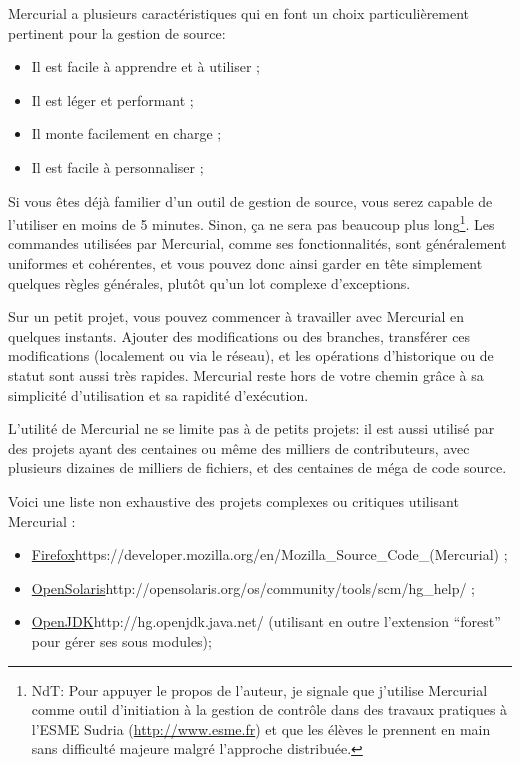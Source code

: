 Mercurial a plusieurs caractéristiques qui en font un choix particulièrement
pertinent pour la gestion de source:
\begin{itemize}
	\item Il est facile à apprendre et à utiliser ;
	\item Il est léger et performant ;
	\item Il monte facilement en charge ; 
	\item Il est facile à personnaliser ;
\end{itemize}

Si vous êtes déjà familier d'un outil de gestion de source, vous serez
capable de l'utiliser en moins de 5 minutes. Sinon, ça ne sera pas beaucoup
plus long\footnote{NdT: Pour appuyer le propos de l'auteur, je signale que 
j'utilise Mercurial comme outil d'initiation à la gestion de contrôle dans
des travaux pratiques à l'ESME Sudria (\url{http://www.esme.fr}) et que les
élèves le prennent en main sans difficulté majeure malgré l'approche distribuée.}. 
Les commandes utilisées par Mercurial, comme ses fonctionnalités, sont 
généralement uniformes et cohérentes, et vous pouvez donc ainsi garder en tête 
simplement quelques règles générales, plutôt qu'un lot complexe d'exceptions.

Sur un petit projet, vous pouvez commencer à travailler avec Mercurial en
quelques instants. Ajouter des modifications ou des branches, transférer 
ces modifications (localement ou via le réseau), et les opérations 
d'historique ou de statut sont aussi très rapides. Mercurial reste hors de 
votre chemin grâce à sa simplicité d'utilisation et sa rapidité d'exécution.

L'utilité de Mercurial ne se limite pas à de petits projets: il est 
aussi utilisé par des projets ayant des centaines ou même des milliers
de contributeurs, avec plusieurs dizaines de milliers de fichiers, et des
centaines de méga de code source.

Voici une liste non exhaustive des projets complexes ou critiques utilisant 
Mercurial :
\begin{itemize}
	\item \url{Firefox}{https://developer.mozilla.org/en/Mozilla\_Source\_Code\_(Mercurial)} ;
	\item \url{OpenSolaris}{http://opensolaris.org/os/community/tools/scm/hg\_help/} ;
	\item \url{OpenJDK}{http://hg.openjdk.java.net/} (utilisant en outre l'extension 
	``forest'' pour gérer ses sous modules);
\end{itemize}

